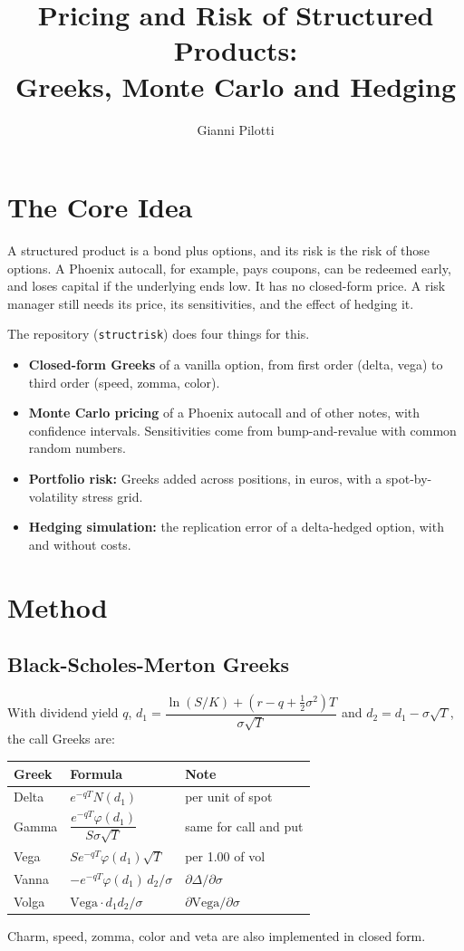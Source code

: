 \documentclass[11pt,a4paper]{article}
\title{Pricing and Risk of Structured Products:\\Greeks, Monte Carlo and Hedging}
\author{Gianni Pilotti}
\date{}
\begin{document}
\maketitle

\section{The Core Idea}
A structured product is a bond plus options, and its risk is the risk of those options. A Phoenix autocall, for example, pays coupons, can be redeemed early, and loses capital if the underlying ends low. It has no closed-form price. A risk manager still needs its price, its sensitivities, and the effect of hedging it.

The repository (\texttt{structrisk}) does four things for this.
\begin{itemize}
\item \textbf{Closed-form Greeks} of a vanilla option, from first order (delta, vega) to third order (speed, zomma, color).
\item \textbf{Monte Carlo pricing} of a Phoenix autocall and of other notes, with confidence intervals. Sensitivities come from bump-and-revalue with common random numbers.
\item \textbf{Portfolio risk:} Greeks added across positions, in euros, with a spot-by-volatility stress grid.
\item \textbf{Hedging simulation:} the replication error of a delta-hedged option, with and without costs.
\end{itemize}

\section{Method}
\subsection{Black-Scholes-Merton Greeks}
With dividend yield $q$, $d_1=\dfrac{\ln(S/K)+(r-q+\tfrac12\sigma^2)T}{\sigma\sqrt T}$ and $d_2=d_1-\sigma\sqrt T$, the call Greeks are:

\begin{center}
\begin{tabular}{@{}lll@{}}
\toprule
Greek & Formula & Note \\
\midrule
Delta & $e^{-qT}N(d_1)$ & per unit of spot \\[2pt]
Gamma & $\dfrac{e^{-qT}\varphi(d_1)}{S\sigma\sqrt T}$ & same for call and put \\[6pt]
Vega & $S e^{-qT}\varphi(d_1)\sqrt T$ & per 1.00 of vol \\[2pt]
Vanna & $-e^{-qT}\varphi(d_1)\,d_2/\sigma$ & $\partial\Delta/\partial\sigma$ \\[2pt]
Volga & $\text{Vega}\cdot d_1d_2/\sigma$ & $\partial\text{Vega}/\partial\sigma$ \\
\bottomrule
\end{tabular}
\end{center}
Charm, speed, zomma, color and veta are also implemented in closed form.
\end{document}
